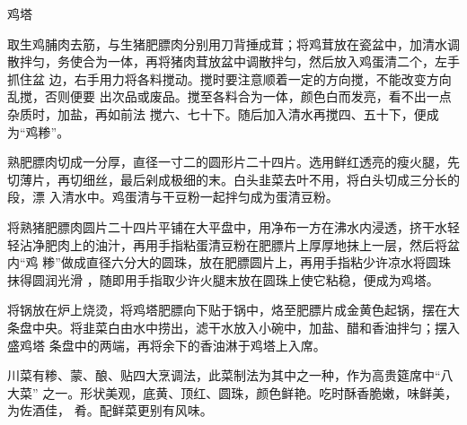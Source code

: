\begin{recipe}[金钱鸡塔]{鸡塔}

\ingredients


\preparation

\step 取生鸡脯肉去筋，与生猪肥膘肉分别用刀背捶成茸；将鸡茸放在瓷盆中，加清水调
散拌匀，务使合为一体，再将猪肉茸放盆中调散拌匀，然后放入鸡蛋清二个，左手抓住盆
边，右手用力将各料搅动。搅时要注意顺着一定的方向搅，不能改变方向乱搅，否则便要
出次品或废品。搅至各料合为一体，颜色白而发亮，看不出一点杂质时，加盐，再如前法
搅六、七十下。随后加入清水再搅四、五十下，便成为“鸡糁”。

\step 熟肥膘肉切成一分厚，直径一寸二的圆形片二十四片。选用鲜红透亮的瘦火腿，先
切薄片，再切细丝，最后剁成极细的末。白头韭菜去叶不用，将白头切成三分长的段，漂
入清水中。鸡蛋清与干豆粉一起拌匀成为蛋清豆粉。

\step 将熟猪肥膘肉圆片二十四片平铺在大平盘中，用净布一方在沸水内浸透，挤干水轻
轻沾净肥肉上的油汁，再用手指粘蛋清豆粉在肥膘片上厚厚地抹上一层，然后将盆内“鸡
糁”做成直径六分大的圆珠，放在肥膘圆片上，再用手指粘少许凉水将圆珠抹得圆润光滑
，随即用手指取少许火腿末放在圆珠上使它粘稳，便成为鸡塔。

\step 将锅放在炉上烧烫，将鸡塔肥膘向下贴于锅中，烙至肥膘片成金黄色起锅，摆在大
条盘中央。将韭菜白由水中捞出，滤干水放入小碗中，加盐、醋和香油拌匀；摆入盛鸡塔
条盘中的两端，再将余下的香油淋于鸡塔上入席。

\features

川菜有糁、蒙、酿、贴四大烹调法，此菜制法为其中之一种，作为高贵筵席中“八大菜”
之一。形状美观，底黄、顶红、圆珠，颜色鲜艳。吃时酥香脆嫩，味鲜美，为佐酒佳，
肴。配鲜菜更别有风味。

\end{recipe}

